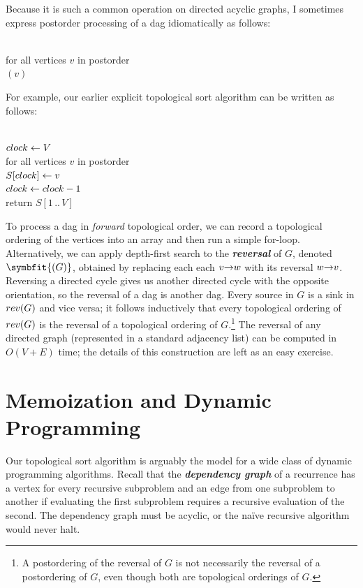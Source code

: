 Because it is such a common operation on directed acyclic graphs, I sometimes express postorder processing of a dag idiomatically as follows:

\begin{pseudocode}
\\
for all vertices $v$ in postorder\\
\Indent {}$(v)$
\end{pseudocode}
For example, our earlier explicit topological sort algorithm can be written as follows:

\begin{pseudocode}
\\
$clock \gets V$\\
for all vertices $v$ in postorder\\
\Indent $S[clock] \gets v$\\
\Indent $clock \gets clock - 1$\\
return $S[1\,..\,V]$
\end{pseudocode}

To process a dag in \textit{forward} topological order, we can record a topological ordering of the vertices into an array and then run a simple for-loop.
Alternatively, we can apply depth-first search to the \textbf{\textit{reversal}} of $G$, denoted \textbf{}$\symbfit{(G)}$, obtained by replacing each each $v\mathord{\rightarrow}w$ with its reversal $w\mathord{\rightarrow}v$.
Reversing a directed cycle gives us another directed cycle with the opposite orientation, so the reversal of a dag is another dag.
Every source in $G$ is a sink in $rev(G)$ and vice versa; it follows inductively that every topological ordering of $rev(G)$ is the reversal of a topological ordering of $G$.\footnote{A postordering of the reversal of $G$ is not necessarily the reversal of a postordering of $G$, even though both are topological orderings of $G$.}
The reversal of any directed graph (represented in a standard adjacency list) can be computed in $O(V+E)$ time; the details of this construction are left as an easy exercise.

\section{Memoization and Dynamic Programming}
\label{sec:6.4}

Our topological sort algorithm is arguably the model for a wide class of dynamic programming algorithms.
Recall that the \textbf{\textit{dependency graph}} of a recurrence has a vertex for every recursive subproblem and an edge from one subproblem to another if evaluating the first subproblem requires a recursive evaluation of the second.
The dependency graph must be acyclic, or the naïve recursive algorithm would never halt.

